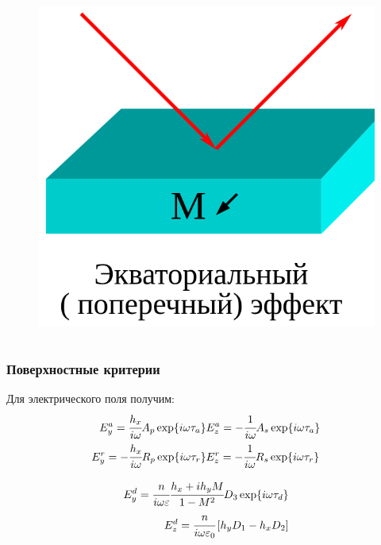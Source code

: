 \documentclass[handout]{beamer}
\newcommand{\insqr}[1]{\left[ #1 \right]}
\newcommand{\eps}{\varepsilon}
\begin{document}
\begin{frame}
\begin{columns}
        \begin{column}{0.3\textwidth}
            \begin{figure}[h]
                \centering
                \includegraphics[width=1\textwidth]{ecvat_kerr.png}
            \end{figure}
        \end{column}
      \end{columns}
\end{frame}


\begin{frame}
    \frametitle{Поверхностные критерии}

        Для электрического поля получим:
        \begin{eqnarray*}
            E_y^a = \cfrac{h_x}{i\omega}A_p \exp{i\omega \tau_a}&
            E_z^a = -\cfrac{1}{i\omega} A_s \exp{i \omega \tau_a}\\
            E^r_y = -\cfrac{h_x}{i\omega} R_p \exp{i \omega \tau_r}&
            E_z^r = -\cfrac{1}{i\omega} R_s \exp{i \omega \tau_r}\\
        \end{eqnarray*}

        \begin{eqnarray*}
            E_y^d = \cfrac{n}{i\omega \eps} \cfrac{h_x + ih_y M}{1 - M^2}D_3 \exp{i \omega \tau_d}\\
            E_z^d = \cfrac{n}{i\omega \eps_0}\insqr{h_y D_1- h_x D_2}
        \end{eqnarray*}
\end{frame}
\end{document}
